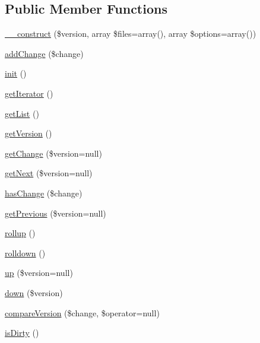 \subsection*{Public Member Functions}
\begin{DoxyCompactItemize}
\item 
\hyperlink{classZendDbSchema__Db__Migration__Manager_a5bc6e13f1d6ae95a759178d5342aa6ca}{\-\_\-\-\_\-construct} (\$version, array \$files=array(), array \$options=array())
\item 
\hyperlink{classZendDbSchema__Db__Migration__Manager_a2450580273691865299544ba500e01b2}{add\-Change} (\$change)
\item 
\hyperlink{classZendDbSchema__Db__Migration__Manager_a0bf69842e44f9aa3a736deb020f0f1fa}{init} ()
\item 
\hyperlink{classZendDbSchema__Db__Migration__Manager_a09b440110f77079a37794ccdb0922d41}{get\-Iterator} ()
\item 
\hyperlink{classZendDbSchema__Db__Migration__Manager_a45f1f55c26694ff5fb0806e4547a3dc8}{get\-List} ()
\item 
\hyperlink{classZendDbSchema__Db__Migration__Manager_ab66af8a9dc5cdb099b8266b68166c4e0}{get\-Version} ()
\item 
\hyperlink{classZendDbSchema__Db__Migration__Manager_a3d4f62489e72876f97bec3cd4448979d}{get\-Change} (\$version=null)
\item 
\hyperlink{classZendDbSchema__Db__Migration__Manager_acb171835d37a1596a4ac6db273bf07ae}{get\-Next} (\$version=null)
\item 
\hyperlink{classZendDbSchema__Db__Migration__Manager_a9973d07f9ffe306e00ea2f9f4beb92e4}{has\-Change} (\$change)
\item 
\hyperlink{classZendDbSchema__Db__Migration__Manager_a3e9a5dfa3447c5eb1b4bbcc8817549c3}{get\-Previous} (\$version=null)
\item 
\hyperlink{classZendDbSchema__Db__Migration__Manager_afbaee9196407b68350626e8601a44a9a}{rollup} ()
\item 
\hyperlink{classZendDbSchema__Db__Migration__Manager_a3acd09811b23c39aa97fed97b4012ac9}{rolldown} ()
\item 
\hyperlink{classZendDbSchema__Db__Migration__Manager_a260901608e7ed2fb5ffef1bf8387e2e9}{up} (\$version=null)
\item 
\hyperlink{classZendDbSchema__Db__Migration__Manager_a265c3edbe064cb4a34289b505046768a}{down} (\$version)
\item 
\hyperlink{classZendDbSchema__Db__Migration__Manager_a3f8150b5e2fc90623a10c7890af80185}{compare\-Version} (\$change, \$operator=null)
\item 
\hyperlink{classZendDbSchema__Db__Migration__Manager_a87a8f6699a75e4b89a0657ae0999203b}{is\-Dirty} ()
\end{DoxyCompactItemize}
